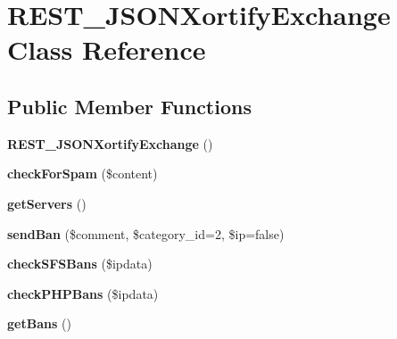\hypertarget{class_r_e_s_t___j_s_o_n_xortify_exchange}{\section{R\-E\-S\-T\-\_\-\-J\-S\-O\-N\-Xortify\-Exchange Class Reference}
\label{class_r_e_s_t___j_s_o_n_xortify_exchange}
}
\subsection*{Public Member Functions}
\begin{DoxyCompactItemize}
\item 
\hypertarget{class_r_e_s_t___j_s_o_n_xortify_exchange_afb73b9f14ef065c178777b8f5c4e68ca}{{\bfseries R\-E\-S\-T\-\_\-\-J\-S\-O\-N\-Xortify\-Exchange} ()}\label{class_r_e_s_t___j_s_o_n_xortify_exchange_afb73b9f14ef065c178777b8f5c4e68ca}

\item 
\hypertarget{class_r_e_s_t___j_s_o_n_xortify_exchange_a7a4f53c3841dc7806455261af557d514}{{\bfseries check\-For\-Spam} (\$content)}\label{class_r_e_s_t___j_s_o_n_xortify_exchange_a7a4f53c3841dc7806455261af557d514}

\item 
\hypertarget{class_r_e_s_t___j_s_o_n_xortify_exchange_a882f365bc81e207dc2123ef707735e82}{{\bfseries get\-Servers} ()}\label{class_r_e_s_t___j_s_o_n_xortify_exchange_a882f365bc81e207dc2123ef707735e82}

\item 
\hypertarget{class_r_e_s_t___j_s_o_n_xortify_exchange_a0293acfa4afe0cb5b2816352a35d8ca7}{{\bfseries send\-Ban} (\$comment, \$category\-\_\-id=2, \$ip=false)}\label{class_r_e_s_t___j_s_o_n_xortify_exchange_a0293acfa4afe0cb5b2816352a35d8ca7}

\item 
\hypertarget{class_r_e_s_t___j_s_o_n_xortify_exchange_a985a563a84e3e5c54694fcce192bda53}{{\bfseries check\-S\-F\-S\-Bans} (\$ipdata)}\label{class_r_e_s_t___j_s_o_n_xortify_exchange_a985a563a84e3e5c54694fcce192bda53}

\item 
\hypertarget{class_r_e_s_t___j_s_o_n_xortify_exchange_aeb1bf9aaee4718870adbd07333490aaf}{{\bfseries check\-P\-H\-P\-Bans} (\$ipdata)}\label{class_r_e_s_t___j_s_o_n_xortify_exchange_aeb1bf9aaee4718870adbd07333490aaf}

\item 
\hypertarget{class_r_e_s_t___j_s_o_n_xortify_exchange_aea26db2906896833d32445a698fc4cdc}{{\bfseries get\-Bans} ()}\label{class_r_e_s_t___j_s_o_n_xortify_exchange_aea26db2906896833d32445a698fc4cdc}


\end{DoxyCompactItemize}
